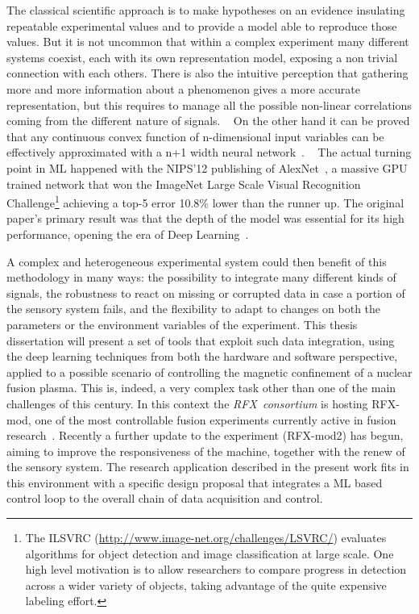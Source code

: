 The classical scientific approach is to make hypotheses on an evidence insulating repeatable experimental values and to provide a model able to reproduce those values. But it is not uncommon that within a complex experiment many different systems coexist, each with its own representation model, exposing a non trivial connection with each others. There is also the intuitive perception that gathering more and more information about a phenomenon gives a more accurate representation, but this requires to manage all the possible non-linear correlations coming from the different nature of signals.
~
On the other hand it can be proved that any continuous convex function of n-dimensional input variables can be effectively approximated with a n+1 width neural network~\cite{csaji2001approximation}\cite{hanin2017universal}.
~
The actual turning point in ML happened with the NIPS'12 publishing of AlexNet~\cite{NIPS2012_4824}, a massive GPU trained network that won the ImageNet Large Scale Visual Recognition Challenge\footnote{The ILSVRC (\url{http://www.image-net.org/challenges/LSVRC/}) evaluates algorithms for object detection and image classification at large scale. One high level motivation is to allow researchers to compare progress in detection across a wider variety of objects, taking advantage of the quite expensive labeling effort.} achieving a top-5 error 10.8\% lower than the runner up. 
The original paper's primary result was that the depth of the model was essential for its high performance, opening the era of Deep Learning~\cite{Goodfellow-et-al-2016}.

A complex and heterogeneous experimental system could then benefit of this methodology in many ways: the possibility to integrate many different kinds of signals, the robustness to react on missing or corrupted data in case a portion of the sensory system fails, and the flexibility to adapt to changes on both the parameters or the environment variables of the experiment.
%
This thesis dissertation will present a set of tools that exploit such data integration, using the deep learning techniques from both the hardware and software perspective, applied to a possible scenario of controlling the magnetic confinement of a nuclear fusion plasma. 
%
This is, indeed, a very complex task other than one of the main challenges of this century. In this context the \textit{RFX~consortium} is hosting RFX-mod, one of the most controllable fusion experiments currently active in fusion research~\cite{SONATO2003161}\cite{doi:10.1063/1.4806765}.
Recently a further update to the experiment (RFX-mod2) has begun, aiming to improve the responsiveness of the machine, together with the renew of the sensory system. The research application described in the present work fits in this environment with a specific design proposal that integrates a \ac{ML} based control loop to the overall chain of data acquisition and control.

